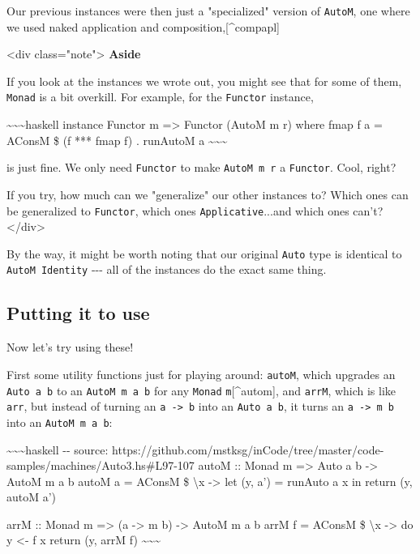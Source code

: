 \documentclass[]{article}
\begin{document}
Our previous instances were then just a "specialized" version of \texttt{AutoM},
one where we used naked application and composition,{[}\^{}compapl{]}

\textless{}div class="note"\textgreater{} \textbf{Aside}

If you look at the instances we wrote out, you might see that for some of them,
\texttt{Monad} is a bit overkill. For example, for the \texttt{Functor}
instance,

\textasciitilde{}\textasciitilde{}\textasciitilde{}haskell instance Functor m
=\textgreater{} Functor (AutoM m r) where fmap f a = AConsM \$ (f *** fmap f) .
runAutoM a \textasciitilde{}\textasciitilde{}\textasciitilde{}

is just fine. We only need \texttt{Functor} to make \texttt{AutoM\ m\ r} a
\texttt{Functor}. Cool, right?

If you try, how much can we "generalize" our other instances to? Which ones can
be generalized to \texttt{Functor}, which ones \texttt{Applicative}...and which
ones can't? \textless{}/div\textgreater{}

By the way, it might be worth noting that our original \texttt{Auto} type is
identical to \texttt{AutoM\ Identity} -\/-\/- all of the instances do the exact
same thing.

\subsection{Putting it to use}

Now let's try using these!

First some utility functions just for playing around: \texttt{autoM}, which
upgrades an \texttt{Auto\ a\ b} to an \texttt{AutoM\ m\ a\ b} for any
\texttt{Monad} \texttt{m}{[}\^{}autom{]}, and \texttt{arrM}, which is like
\texttt{arr}, but instead of turning an \texttt{a\ -\textgreater{}\ b} into an
\texttt{Auto\ a\ b}, it turns an \texttt{a\ -\textgreater{}\ m\ b} into an
\texttt{AutoM\ m\ a\ b}:

\textasciitilde{}\textasciitilde{}\textasciitilde{}haskell -\/- source:
https://github.com/mstksg/inCode/tree/master/code-samples/machines/Auto3.hs\#L97-107
autoM :: Monad m =\textgreater{} Auto a b -\textgreater{} AutoM m a b autoM a =
AConsM \$ \textbackslash{}x -\textgreater{} let (y, a') = runAuto a x in return
(y, autoM a')

arrM :: Monad m =\textgreater{} (a -\textgreater{} m b) -\textgreater{} AutoM m
a b arrM f = AConsM \$ \textbackslash{}x -\textgreater{} do y \textless{}- f x
return (y, arrM f) \textasciitilde{}\textasciitilde{}\textasciitilde{}
\end{document}
